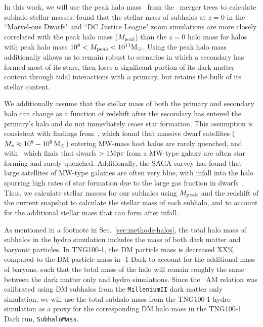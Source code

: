 \documentclass[twocolumn]{aastex631}
\begin{document}
    
    
    


    In this work, we will use the peak halo mass \Mpeak\ from the \sublink\ merger trees to calculate subhalo stellar masses. 
    \citet{Munshi2021} found that the stellar mass of subhalos at $z=0$ in the ``Marvel-ous Dwarfs" and ``DC Justice League" zoom simulations are more closely correlated with the peak halo mass ($M_{peak}$) than the $z=0$ halo mass for halos with peak halo mass $10^8<M_{\rm peak}<10^{11} \mathrm{M}_\odot$. 
    Using the peak halo mass additionally allows us to remain robust to scenarios in which a secondary has formed most of its stars, then loses a significant portion of its dark matter content through tidal interactions with a primary, but retains the bulk of its stellar content.
        
    We additionally assume that the stellar mass of both the primary and secondary halo can change as a function of redshift after the secondary has entered the primary's halo and do not immediately cease star formation. 
    This assumption is consistent with findings from~\cite{Akins2021}, which found that massive dwarf satellites ($M_*\approx 10^8-10^9\, \mathrm{M}_\odot$) entering MW-mass host halos are rarely quenched, and with~\cite{geha13} which finds that dwarfs $>1\mathrm{Mpc}$ from a MW-type galaxy are often star forming and rarely quenched.
    Additionally, the SAGA survey has found that large satellites of MW-type galaxies are often very blue, with infall into the halo spurring high rates of star formation due to the large gas fraction in dwarfs~\citep{saga}. 
    Thus, we calculate stellar masses for our subhalos using $M_{\rm peak}$ and the redshift of the current snapshot to calculate the stellar mass of each subhalo, and to account for the additional stellar mass that can form after infall. 

    As mentioned in a footnote in Sec.~\ref{sec:methods-halos}, the total halo mass of subhalos in the hydro simulation includes the mass of both dark matter and baryonic particles. 
    In TNG100-1, the DM particle mass is decreased XX\% compared to the DM particle mass in -1 Dark to account for the additional mass of baryons, such that the total mass of the halo will remain roughly the same between the dark matter only and hydro simulations. 
    Since the~\citet{Moster2013} AM relation was calibrated using DM subhalos from the \texttt{MilleniumII} dark matter only simulation, we will use the total subhalo mass from the TNG100-1 hydro simulation as a proxy for the corresponding DM halo mass in the TNG100-1 Dark run, \texttt{SubhaloMass}. 
\end{document}
